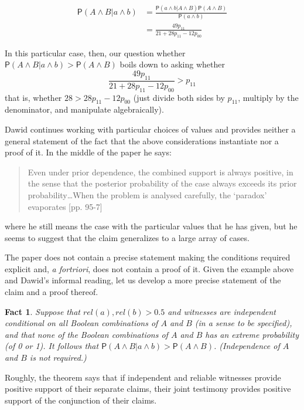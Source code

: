 \documentclass[10pt,dvipsnames,enabledeprecatedfontcommands]{scrartcl}
\newtheorem{fact}{Fact}
\newcommand{\et}{\wedge}
\newcommand{\pr}[1]{\mathsf{P}(#1)}
\begin{document}
\begin{align*}
 \pr{A\et B\vert a \et b} & =
         \frac{\pr{a\et b \vert A \et B}\pr{A\et B}}
             {\pr{a\et b}}\\
         & =
                     \frac{49p_{11}}
                           {21+28p_{11}-12p_{00}} 
         \end{align*}

In this particular case, then, our question whether
\(\pr{A\et B\vert a\et b}>\pr{A\et B}\) boils down to asking whether
\[\frac{49p_{11}}{21+28p_{11}-12p_{00}}> p_{11}\] that is, whether
\(28 > 28 p_{11}-12p_{00}\) (just divide both sides by \(p_{11}\),
multiply by the denominator, and manipulate algebraically).

Dawid continues working with particular choices of values and provides
neither a general statement of the fact that the above considerations
instantiate nor a proof of it. In the middle of the paper he says:

\begin{quote}
 Even under prior dependence, the combined support is always positive, in the sense that the posterior probability of the case always exceeds its prior probability\dots When the problem is analysed carefully, the `paradox' evaporates [pp. 95-7]\end{quote}

\noindent where he still means the case with the particular values that
he has given, but he seems to suggest that the claim generalizes to a
large array of cases.

The paper does not contain a precise statement making the conditions
required explicit and, \emph{a fortriori}, does not contain a proof of
it. Given the example above and Dawid's informal reading, let us develop
a more precise statement of the claim and a proof thereof.

\begin{fact}\label{ther:increase}
Suppose that  $rel(a),rel(b)>0.5$ and witnesses are independent conditional on all Boolean combinations of $A$ and $B$  (in a sense to be specified), and that none of the Boolean combinations of $A$ and $B$ has an extreme probability (of 0 or 1). It follows that  $\pr{A\et B \vert a\et b}>\pr{A\et B}$. (Independence of $A$ and $B$ is not required.)
\end{fact}

Roughly, the theorem says that if independent and reliable witnesses
provide positive support of their separate claims, their joint testimony
provides positive support of the conjunction of their claims.
\end{document}
